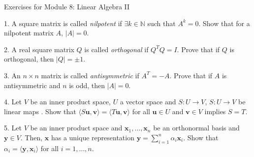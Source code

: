 \documentclass{article}
\theoremstyle{remark} %
\newcommand{\bu}{{\mathbf{u}}}
\newcommand{\bv}{{\mathbf{v}}}
\newcommand{\bx}{{\mathbf{x}}}
\newcommand{\by}{{\mathbf{y}}}
\newcommand{\innerprod}[1]{\langle #1 \rangle}
\newcommand{\N}{{\mathbb{N}}}
\begin{document}
\begin{center}
\Large{Exercises for Module 8: Linear Algebra II}
\end{center}


1.  A square matrix is called \emph{nilpotent} if $\exists k \in \N$ such that $A^k = 0$. Show that for a nilpotent matrix $A$, $|A| = 0$.

\vspace{7cm} %




2. A real square matrix $Q$ is called \emph{orthogonal} if $Q^T Q = I$. Prove that if $Q$ is orthogonal, then $|Q| = \pm 1$.

\vspace{7cm} %



3. An $n \times n$ matrix is called \emph{antisymmetric} if $A^T = -A$. Prove that if $A$ is antisymmetric and $n$ is odd, then $|A|=0$. 

\vspace{7cm} %




4. Let $V$ be an inner product space, $U$ a vector space and $S\colon U \to V$, $S\colon U \to V$ be linear maps . Show that $\innerprod{S\bu,\bv}= \innerprod{T\bu, \bv}$ for all $\bu \in U$ and $\bv \in V$ implies $S=T$.

\vspace{11cm} %




5. Let $V$ be an inner product space and $\bx_1,\ldots, \bx_n$ be an orthonormal basis and $\by \in V$. Then, $\bx$ has a unique representation $\by =\sum_{i=1}^n \alpha_i \bx_i$. Show that $\alpha_i = \innerprod{\by,\bx_i}$ for all $i= 1,\ldots, n$.
\vspace{12cm} %
\end{document}
